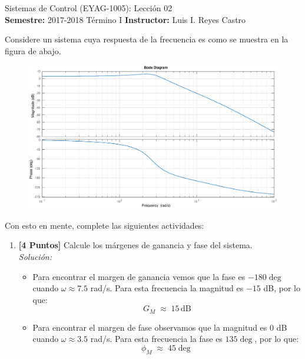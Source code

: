 \documentclass[ a4paper, twoside, 11pt]{article}
\newcommand{\numero}{02}
\begin{document}
\allowdisplaybreaks

\begin{center}
\Large Sistemas de Control (EYAG-1005): Lecci\'on \numero \\[1ex]
\small \textbf{Semestre:} 2017-2018 T\'ermino I \qquad
\textbf{Instructor:} Luis I. Reyes Castro
\end{center}
\halfskip



\begin{problem}
Considere un sistema cuya respuesta de la frecuencia es como se muestra en la figura de abajo. 

\begin{figure}[htb]
\centering
\includegraphics[width=\textwidth]{leccion-bode.eps}
\end{figure}

Con esto en mente, complete las siguientes actividades: 
\begin{enumerate}[label=\alph*.]
\item \textbf{[4 Puntos]} Calcule los m\'argenes de ganancia y fase del sistema. \\[1ex] \emph{Soluci\'on:}
\begin{itemize}
\item Para encontrar el margen de ganancia vemos que la fase es $-180\deg$ cuando \linebreak $\omega \approx 7.5$ rad/s. Para esta frecuencia la magnitud es $-15$ dB, por lo que: 
\[
G_M \; \approx \; 15 \, \text{dB}
\]
\item Para encontrar el margen de fase observamos que la magnitud es 0 dB cuando $\omega \approx 3.5$ rad/s. Para esta frecuencia la fase es $135\deg$, por lo que: 
\[
\phi_M \; \approx \; 45\deg
\]


\end{itemize}
\end{enumerate}
\end{problem}
\end{document}

